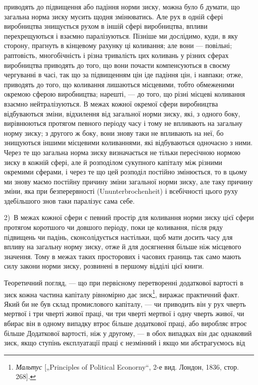 \parcont{}  %
приводять до підвищення або падіння норми зиску, можна було б думати, що загальна норма зиску мусить
щодня змінюватись. Але рух в одній сфері виробництва знищується рухом в іншій сфері виробництва,
впливи перехрещуються і взаємно
паралізуються. Пізніше ми дослідимо, куди, в яку сторону, прагнуть в кінцевому рахунку ці коливання;
але вони — повільні;
раптовість, многобічність і різна тривалість цих коливань у
різних сферах виробництва приводять до того, що вони почасти компенсуються в своєму чергуванні в
часі, так що за
підвищенням цін іде падіння цін, і навпаки; отже, приводять до того, що коливання лишаються
місцевими, тобто обмеженими окремою сферою виробництва; нарешті, — до того, що різні місцеві
коливання взаємно нейтралізуються. В межах кожної окремої сфери виробництва відбуваються зміни,
відхилення
від загальної норми зиску, які, з одного боку, вирівнюються
протягом певного періоду часу і тому не впливають на загальну
норму зиску; з другого ж боку, вони знову таки не впливають
на неї, бо знищуються іншими місцевими коливаннями, які відбуваються одночасно з ними. Через те що
загальна норма зиску
визначається не тільки пересічною нормою зиску в кожній сфері,
але й розподілом сукупного капіталу між різними окремими
сферами, і через те що цей розподіл постійно змінюється, то
в цьому ми знову маємо постійну причину зміни загальної норми
зиску, але таку причину зміни, яка при безперервності (Ununterbrochenheit)
і всебічності цього руху
здебільшого знов таки
паралізує сама себе.

2)~В межах кожної сфери є певний простір для коливання
норми зиску цієї сфери протягом коротшого чи довшого періоду, поки це коливання, після ряду
підвищень чи падінь,
сконсолідується настільки, щоб мати досить часу для впливу
на загальну норму зиску, отже й для досягнення більше ніж
місцевого значення. Тому в межах таких просторових і часових границь так само мають силу закони
норми зиску, розвинені в першому відділі цієї книги.

Теоретичний погляд, — що при первісному перетворенні додаткової вартості в зиск кожна частина
капіталу рівномірно
дає зиск\footnote{
\emph{Мальтус} [„Principles of Political Econorny“, 2-е вид. Лондон, 1836, стор. 268].
}, виражає практичний факт. Який би не був склад промислового капіталу, — чи приводить він
у рух чверть мертвої
і три чверті живої праці, чи три чверті мертвої і одну чверть
живої, чи вбирає він в одному випадку втроє більше додаткової
праці, або виробляє втроє більше Додаткової вартості, ніж у другому, — в обох випадках він дає
однаковий зиск, якщо ступінь
експлуатації праці є незмінний і якщо ми абстрагуємось від
\parbreak{}  %
